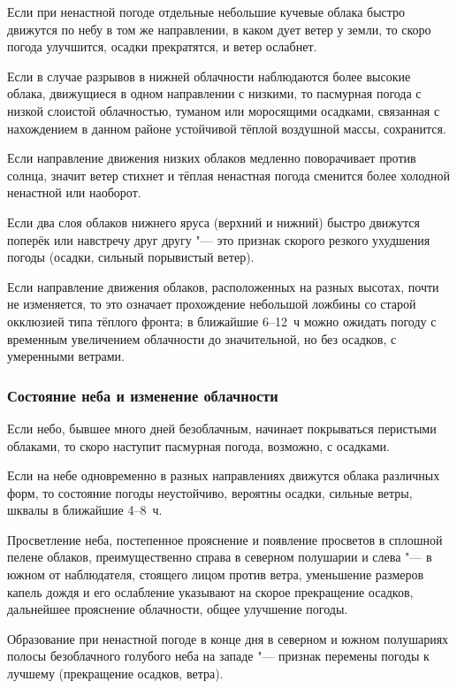  Если при ненастной погоде отдельные небольшие кучевые облака
быстро движутся по небу в том же направлении, в каком дует ветер у
земли, то скоро погода улучшится, осадки прекратятся, и ветер
ослабнет.

 Если в случае разрывов в нижней облачности наблюдаются более
высокие облака, движущиеся в одном направлении с низкими, то пасмурная
погода с низкой слоистой облачностью, туманом или моросящими осадками,
связанная с нахождением в данном районе устойчивой тёплой воздушной
массы, сохранится.

 Если направление движения низких облаков медленно поворачивает
против солнца, значит ветер стихнет и тёплая ненастная погода сменится
более холодной ненастной или наоборот.

 Если два слоя облаков нижнего яруса (верхний и нижний) быстро
движутся поперёк или навстречу друг другу "--- это признак скорого резкого
ухудшения погоды (осадки, сильный порывистый ветер).

 Если направление движения облаков, расположенных на разных
высотах, почти не изменяется, то это означает прохождение небольшой
ложбины со старой окклюзией типа тёплого фронта; в ближайшие 6--12~ч
можно ожидать погоду с временным увеличением облачности до
значительной, но без осадков, с умеренными ветрами.

\subsubsection{Состояние неба и изменение облачности}

 Если небо, бывшее много дней безоблачным, начинает покрываться
перистыми облаками, то скоро наступит пасмурная погода, возможно, с
осадками.

 Если на небе одновременно в разных направлениях движутся облака
различных форм, то состояние погоды неустойчиво, вероятны осадки,
сильные ветры, шквалы в ближайшие 4--8~ч.

 Просветление неба, постепенное прояснение и появление просветов
в сплошной пелене облаков, преимущественно справа в северном полушарии
и слева "--- в южном от наблюдателя, стоящего лицом против ветра,
уменьшение размеров капель дождя и его ослабление указывают на скорое
прекращение осадков, дальнейшее прояснение облачности, общее улучшение
погоды.

 Образование при ненастной погоде в конце дня в северном и южном
полушариях полосы безоблачного голубого неба на западе "--- признак
перемены погоды к лучшему (прекращение осадков, ветра).

